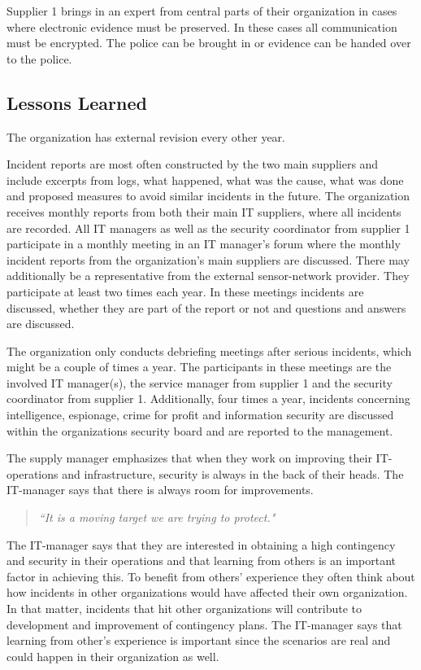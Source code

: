 Supplier 1 brings in an expert from central parts of their organization in cases where electronic evidence must be preserved. In these cases all communication must be encrypted. The police can be brought in or evidence can be handed over to the police.

\subsection{Lessons Learned}
The organization has external revision every other year.

Incident reports are most often constructed by the two main suppliers and include excerpts from logs, what happened, what was the cause, what was done and proposed measures to avoid similar incidents in the future. The organization receives monthly reports from both their main IT suppliers, where all incidents are recorded. All IT managers as well as the security coordinator from supplier 1 participate in a monthly meeting in an IT manager's forum where the monthly incident reports from the organization's main suppliers are discussed. There may additionally be a representative from the external sensor-network provider. They participate at least two times each year. In these meetings incidents are discussed, whether they are part of the report or not and questions and answers are discussed.

The organization only conducts debriefing meetings after serious incidents, which might be a couple of times a year. The participants in these meetings are the involved IT manager(s), the service manager from supplier 1 and the security coordinator from supplier 1. Additionally, four times a year, incidents concerning intelligence, espionage, crime for profit and information security are discussed within the organizations security board and are reported to the management. 

The supply manager emphasizes that when they work on improving their IT-operations and infrastructure, security is always in the back of their heads. The IT-manager says that there is always room for improvements. 
\begin{quote}
\textit{``It is a moving target we are trying to protect."}
\end{quote}

The IT-manager says that they are interested in obtaining a high contingency %
and security in their operations and that learning from others is an important factor in achieving this. To benefit from others' experience they often think about how incidents in other organizations would have affected their own organization. In that matter, incidents that hit other organizations will contribute to development and improvement of contingency plans. The IT-manager says that learning from other's experience is important since the scenarios are real and could happen in their organization as well.

